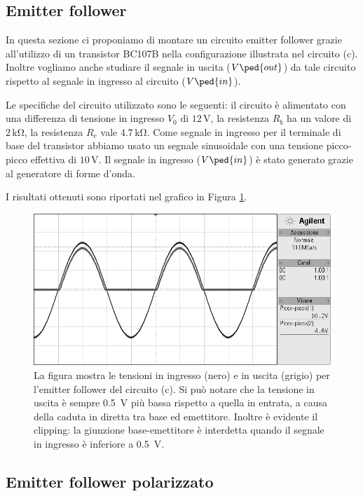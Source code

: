 \subsection*{Emitter follower}

In questa sezione ci proponiamo di montare un circuito emitter follower grazie all'utilizzo di un transistor BC107B nella configurazione illustrata nel circuito (c). Inoltre vogliamo anche studiare il segnale in uscita ($V\ped{out}$) da tale circuito rispetto al segnale in ingresso al circuito ($V\ped{in}$).

Le specifiche del circuito utilizzato sono le seguenti: il circuito è alimentato con una differenza di tensione in ingresso $V_0$ di $12\,\si{\volt}$, la resistenza $R_b$ ha un valore di $2\,\si{\kilo\ohm}$, la resistenza $R_e$ vale $4.7\,\si{\kilo\ohm}$. Come segnale in ingresso per il terminale di base del transistor abbiamo usato un segnale sinusoidale con una tensione picco-picco effettiva di $10\,\si{\volt}$. Il segnale in ingresso ($V\ped{in}$) è stato generato grazie al generatore di forme d'onda.

I risultati ottenuti sono riportati nel grafico in Figura \ref{fig:emitter}.

\begin{figure}
    \includegraphics[scale=0.5]{emitter.png}
    \caption{La figura mostra le tensioni in ingresso (nero) e in uscita (grigio) per l'emitter follower
        del circuito (c). Si può notare che la tensione in uscita è sempre \SI{0.5}{\volt} più bassa rispetto a
        quella in entrata, a causa della caduta in diretta tra base ed emettitore. Inoltre è evidente il clipping:
        la giunzione base-emettitore è interdetta quando il segnale in ingresso è inferiore a \SI{0.5}{\volt}.}
    \label{fig:emitter}
\end{figure}

\subsection*{Emitter follower polarizzato}

